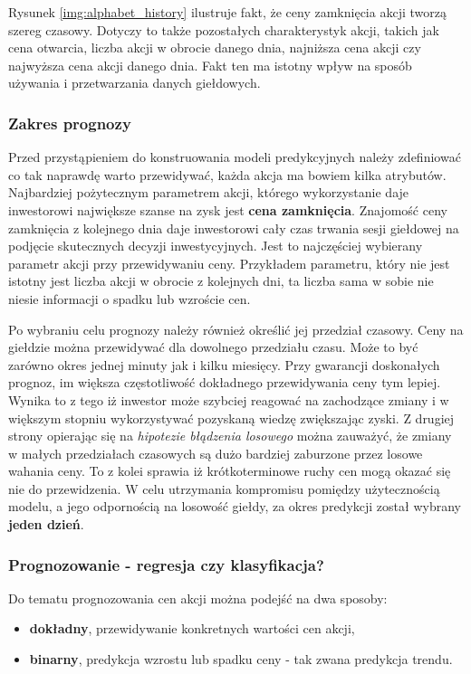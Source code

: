\documentclass[a4paper, twoside, 11pt, openright]{article}
\begin{document}
Rysunek \ref{img:alphabet_history} ilustruje fakt, że ceny zamknięcia akcji tworzą szereg czasowy. Dotyczy to także pozostałych charakterystyk akcji, takich jak cena otwarcia, liczba akcji w obrocie danego dnia, najniższa cena akcji czy najwyższa cena akcji danego dnia. Fakt ten ma istotny wpływ na sposób używania i przetwarzania danych giełdowych.

\subsubsection{Zakres prognozy}

Przed przystąpieniem do konstruowania modeli predykcyjnych należy zdefiniować co tak naprawdę warto przewidywać, każda akcja ma bowiem kilka atrybutów. Najbardziej pożytecznym parametrem akcji, którego wykorzystanie daje inwestorowi największe szanse na zysk jest \textbf{cena zamknięcia}. Znajomość ceny zamknięcia z kolejnego dnia daje inwestorowi cały czas trwania sesji giełdowej na podjęcie skutecznych decyzji inwestycyjnych. Jest to najczęściej wybierany parametr akcji przy przewidywaniu ceny. Przykładem parametru, który nie jest istotny jest liczba akcji w obrocie z kolejnych dni, ta liczba sama w sobie nie niesie informacji o spadku lub wzroście cen.

\bigskip

Po wybraniu celu prognozy należy również określić jej przedział czasowy. Ceny na giełdzie można przewidywać dla dowolnego przedziału czasu. Może to być zarówno okres jednej minuty jak i kilku miesięcy. Przy gwarancji doskonałych prognoz, im większa częstotliwość dokładnego przewidywania ceny tym lepiej. Wynika to z tego iż inwestor może szybciej reagować na zachodzące zmiany i w większym stopniu wykorzystywać pozyskaną wiedzę zwiększając zyski. Z drugiej strony opierając się na \textit{hipotezie błądzenia losowego} można zauważyć, że zmiany w małych przedziałach czasowych są dużo bardziej zaburzone przez losowe wahania ceny. To z kolei sprawia iż krótkoterminowe ruchy cen mogą okazać się nie do przewidzenia. W celu utrzymania kompromisu pomiędzy użytecznością modelu, a jego odpornością na losowość giełdy, za okres predykcji został wybrany \textbf{jeden dzień}.
 
\subsubsection{Prognozowanie - regresja czy klasyfikacja?}

Do tematu prognozowania cen akcji można podejść na dwa sposoby:
\begin{itemize}
\item{\textbf{dokładny}, przewidywanie konkretnych wartości cen akcji,}
\item{\textbf{binarny}, predykcja wzrostu lub spadku ceny - tak zwana predykcja trendu.}
\end{itemize}
\end{document}
